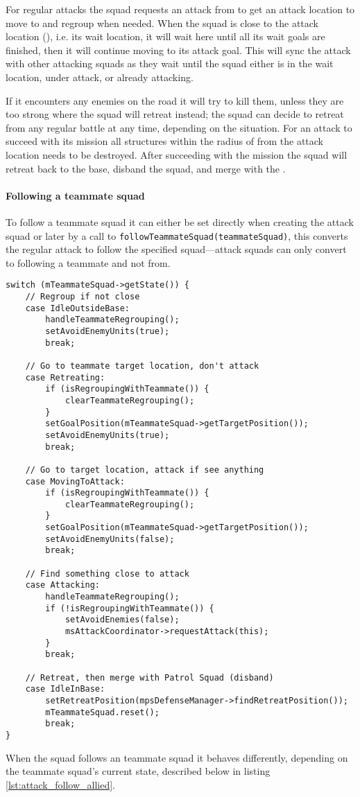 For regular attacks the squad requests an attack from  to get an
attack location to move to and regroup when needed. When the squad is close to the attack location
(\squadAttackWaitingPositionDistanceFromGoal), i.e. its wait location, it will wait here until all
its wait goals are finished, then it will continue moving to its attack goal. This will sync the
attack with other attacking squads as they wait until the squad either is in the wait location,
under attack, or already attacking.

If it encounters any enemies on the road it will try to kill them, unless they are too strong where
the squad will retreat instead; the squad can decide to retreat from any regular battle at any time,
depending on the situation. For an attack to succeed with its mission all structures within the
radius of \squadAttackStructuresDestroyedGoalDistance from the attack location needs to be
destroyed. After succeeding with the mission the squad will retreat back to the base, disband the
squad, and merge with the .

\paragraph{Following a teammate squad}
To follow a teammate squad it can either be set directly when creating the attack squad or later by
a call to \texttt{followTeammateSquad(teammateSquad)}, this converts the regular attack to follow
the specified squad—attack squads can only convert to following a teammate and not from.


\begin{lstlisting}[caption={Squad actions depending on the teammate squad's state},label={lst:attack_follow_allied}]
switch (mTeammateSquad->getState()) {
	// Regroup if not close
	case IdleOutsideBase:
		handleTeammateRegrouping();
		setAvoidEnemyUnits(true);
		break;
	
	// Go to teammate target location, don't attack
	case Retreating:
		if (isRegroupingWithTeammate()) {
			clearTeammateRegrouping();
		}
		setGoalPosition(mTeammateSquad->getTargetPosition());
		setAvoidEnemyUnits(true);
		break;

	// Go to target location, attack if see anything
	case MovingToAttack: 
		if (isRegroupingWithTeammate()) {
			clearTeammateRegrouping();
		}
		setGoalPosition(mTeammateSquad->getTargetPosition());
		setAvoidEnemyUnits(false);
		break;

	// Find something close to attack
	case Attacking:
		handleTeammateRegrouping();
		if (!isRegroupingWithTeammate()) {
			setAvoidEnemies(false);
			msAttackCoordinator->requestAttack(this);
		}
		break;

	// Retreat, then merge with Patrol Squad (disband)
	case IdleInBase:
		setRetreatPosition(mpsDefenseManager->findRetreatPosition());
		mTeammateSquad.reset();
		break;
}
\end{lstlisting}
When the squad follows an teammate squad it behaves differently, depending on the teammate squad's
current state, described below in listing \ref{lst:attack_follow_allied}.

